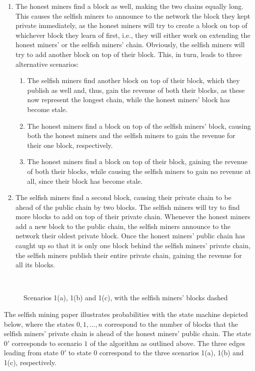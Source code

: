 \begin{enumerate}
\item 
The honest miners find a block as well, making the two chains equally long.
This causes the selfish miners to announce to the network the block they kept private immediately, as the honest miners will try to create a block on top of whichever block they learn of first, i.e., they will either work on extending the honest miners’ or the selfish miners’ chain.
Obviously, the selfish miners will try to add another block on top of their block.
This, in turn, leads to three alternative scenarios:
\begin{enumerate}
\item
The selfish miners find another block on top of their block, which they publish as well and, thus, gain the revenue of both their blocks, as these now represent the longest chain, while the honest miners' block has become stale.
\item
The honest miners find a block on top of the selfish miners' block, causing both the honest miners and the selfish miners to gain the revenue for their one block, respectively.
\item
The honest miners find a block on top of their block, gaining the revenue of both their blocks, while causing the selfish miners to gain no revenue at all, since their block has become stale.
\end{enumerate}
\item
The selfish miners find a second block, causing their private chain to be ahead of the public chain by two blocks.
The selfish miners will try to find more blocks to add on top of their private chain.
Whenever the honest miners add a new block to the public chain, the selfish miners announce to the network their oldest private block.
Once the honest miners’ public chain has caught up so that it is only one block behind the selfish miners' private chain, the selfish miners publish their entire private chain, gaining the revenue for all its blocks.
\end{enumerate}
\leavevmode\\
\begin{figure}[H]
\centering

\caption*{Scenarios 1(a), 1(b) and 1(c), with the selfish miners' blocks dashed}
\end{figure}

The selfish mining paper illustrates probabilities with the state machine depicted below, where the states $0, 1, ..., n$ correspond to the number of blocks that the selfish miners' private chain is ahead of the honest miners' public chain.
The state $0'$ corresponds to scenario $1$ of the algorithm as outlined above.
The three edges leading from state $0'$ to state $0$ correspond to the three scenarios 1(a), 1(b) and 1(c), respectively.

